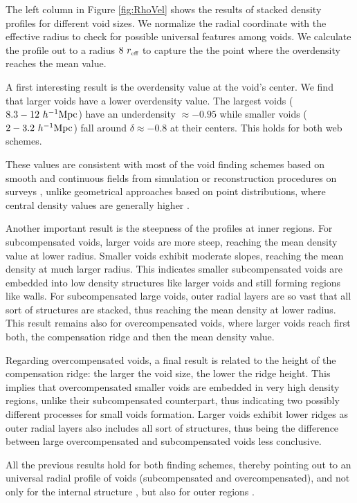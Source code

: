 \documentclass[a4,useAMS,usenatbib,usegraphicx]{mn2e}
\newcommand{\hMpc}{{\ifmmode{h^{-1}{\rm Mpc}}\else{$h^{-1}$Mpc}\fi}}
\newcommand{\reff}{{\ifmmode{r_{\mbox{\tiny eff}}}\else{$r_{\mbox{\tiny eff}}$}\fi}}
\begin{document}
The left column in Figure \ref{fig:RhoVel} shows the results of
stacked density profiles for different void sizes. 
We normalize the radial coordinate with the effective radius to check
for possible universal features among voids. 
We calculate the profile out to a radius $8\ \reff$  to capture the
the point where the overdensity reaches the mean value.


A first interesting result is the overdensity value at the void's
center.
We find that larger voids have a lower overdensity value.
The largest voids ($8.3-12\ \hMpc$) have an underdensity
$\approx-0.95$ while smaller voids  ($2-3.2\ \hMpc$) fall around $\delta\approx 
-0.8$ at their centers.
This holds for both web schemes. 

These values are consistent with most of the void finding schemes
based on smooth and continuous fields from simulation or
reconstruction procedures on surveys \citep{Plionis02, Colberg05,
  Shandarin06,  Platen07, Neyrinck08, MunozCuartas11, Neyrinck13,
  Ricciardelli2013}, unlike geometrical approaches based on point
distributions, where central density values are generally higher
\citep{Colberg08}. 


Another important result is the steepness of the profiles at inner
regions. For subcompensated voids, larger voids are more steep, reaching
the mean density value at lower radius. Smaller voids exhibit moderate
slopes, reaching the mean density at much larger radius. This indicates 
smaller subcompensated voids are embedded into low density structures like 
larger voids and still forming regions like walls. For subcompensated large
voids, outer radial layers are so vast that all sort of structures are 
stacked, thus reaching the mean density at lower radius. This result 
remains also for overcompensated voids, where larger voids reach first 
both, the compensation ridge and then the mean density value.


Regarding overcompensated voids, a final result is related to the height 
of the compensation ridge: the larger the void size, the lower the ridge
height. This implies that overcompensated smaller voids are embedded in 
very high density regions, unlike their subcompensated counterpart, thus 
indicating two possibly different processes for small voids formation. 
Larger voids exhibit lower ridges as outer radial layers also includes all
sort of structures, thus being the difference between large overcompensated
and subcompensated voids less conclusive.


All the previous results hold for both finding schemes, thereby pointing 
out to an universal radial profile of voids (subcompensated and 
overcompensated), and not only for the internal structure \citep{Colberg05, 
Ricciardelli2013}, but also for outer regions \citep{Lavaux12, Hamaus14}.
\end{document}
